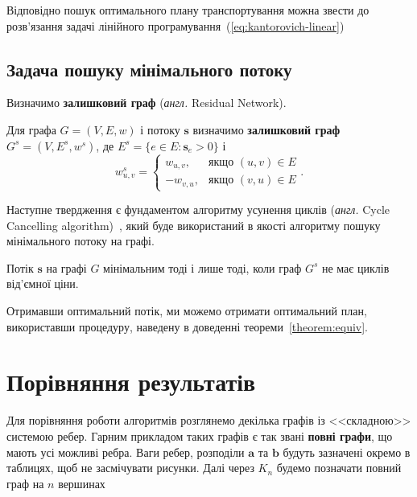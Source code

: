 Відповідно пошук оптимального плану транспортування можна звести до розв'язання задачі лінійного
програмування~(\ref{eq:kantorovich-linear})

\subsection{Задача пошуку мінімального потоку}

Визначимо \textbf{залишковий граф} (\textit{англ.} Residual Network).
\begin{definition}
    Для графа $G = (V, E, w)$ і потоку $\mathbf{s}$ визначимо \textbf{залишковий граф} $G^s = (V, E^s, w^s)$, де
    $E^s = \{e \in E : \mathbf{s}_e > 0\}$ і 
    $$
        w^s_{u, v} = \begin{cases}
            w_{u, v}, &\text{якщо }(u, v) \in E \\
            -w_{v, u}, &\text{якщо }(v, u) \in E
        \end{cases}.
    $$
\end{definition}

Наступне твердження є фундаментом алгоритму усунення циклів
(\textit{англ.} Cycle Cancelling algorithm)~\cite{cycle}, який буде використаний в якості
алгоритму пошуку мінімального потоку на графі.

\begin{theorem}
    Потік $\mathbf{s}$ на графі $G$ мінімальним тоді і лише тоді, коли граф $G^s$ не має циклів від'ємної ціни.
\end{theorem}

Отримавши оптимальний потік, ми можемо отримати оптимальний план, використавши процедуру,
наведену в доведенні теореми~\ref{theorem:equiv}.

\section{Порівняння результатів}
Для порівняння роботи алгоритмів розглянемо декілька графів із <<складною>> системою ребер. Гарним прикладом таких графів
є так звані \textbf{повні графи}, що мають усі можливі ребра. Ваги ребер, розподіли $\mathbf{a}$ та $\mathbf{b}$
будуть зазначені окремо в таблицях, щоб не засмічувати рисунки. Далі через $K_n$ будемо позначати повний граф на
$n$ вершинах


